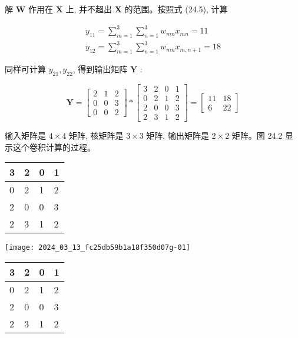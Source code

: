 \documentclass[10pt]{article}
\begin{document}
解 $\boldsymbol{W}$ 作用在 $\boldsymbol{X}$ 上, 并不超出 $\boldsymbol{X}$ 的范围。按照式 (24.5), 计算

$$
\begin{gathered}
y_{11}=\sum_{m=1}^{3} \sum_{n=1}^{3} w_{m n} x_{m n}=11 \\
y_{12}=\sum_{m=1}^{3} \sum_{n=1}^{3} w_{m n} x_{m, n+1}=18
\end{gathered}
$$

同样可计算 $y_{21}, y_{22}$, 得到输出矩阵 $\boldsymbol{Y}$ :

$$
\boldsymbol{Y}=\left[\begin{array}{lll}
2 & 1 & 2 \\
0 & 0 & 3 \\
0 & 0 & 2
\end{array}\right] *\left[\begin{array}{cccc}
3 & 2 & 0 & 1 \\
0 & 2 & 1 & 2 \\
2 & 0 & 0 & 3 \\
2 & 3 & 1 & 2
\end{array}\right]=\left[\begin{array}{cc}
11 & 18 \\
6 & 22
\end{array}\right]
$$

输入矩阵是 $4 \times 4$ 矩阵, 核矩阵是 $3 \times 3$ 矩阵, 输出矩阵是 $2 \times 2$ 矩阵。图 24.2 显示这个卷积计算的过程。

\begin{center}
\begin{tabular}{|l|l|l|l|}
\hline
3 & 2 & 0 & 1 \\
\hline
0 & 2 & 1 & 2 \\
\hline
2 & 0 & 0 & 3 \\
\hline
2 & 3 & 1 & 2 \\
\hline
\end{tabular}
\end{center}

\begin{center}
\texttt{[image: 2024\_03\_13\_fc25db59b1a18f350d07g-01]}
\end{center}

\begin{center}
\begin{tabular}{|l|l|l|l|}
\hline
3 & 2 & 0 & 1 \\
\hline
0 & 2 & 1 & 2 \\
\hline
2 & 0 & 0 & 3 \\
\hline
2 & 3 & 1 & 2 \\
\hline
\end{tabular}
\end{center}
\end{document}
